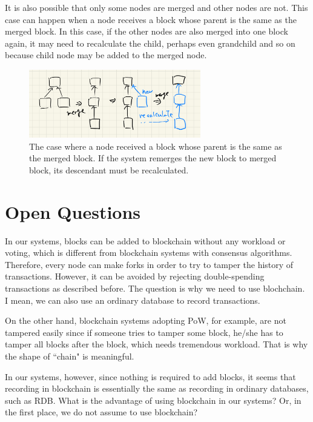 \documentclass[a4j,11pt,uplatex,twocolumn]{article}
\begin{document}
It is also possible that only some nodes are merged and other nodes are not.
This case can happen when a node receives a block whose parent is the same as the merged block.
In this case, if the other nodes are also merged into one block again, it may need to recalculate the child, perhaps even grandchild and so on because child node may be added to the merged node.
\begin{figure}[tbp]
    \begin{center}
        \includegraphics[width=7.5cm]{./fig/recalculate.jpeg}
        \caption{The case where a node received a block whose parent is the same as the merged block. If the system remerges the new block to merged block, its descendant must be recalculated.}
        \label{fig:recalculate}
    \end{center}
\end{figure}

\section{Open Questions}
In our systems, blocks can be added to blockchain without any workload or voting, which is different from blockchain systems with consensus algorithms.
Therefore, every node can make forks in order to try to tamper the history of transactions.
However, it can be avoided by rejecting double-spending transactions as described before.
The question is why we need to use blochchain.
I mean, we can also use an ordinary database to record transactions.

On the other hand, blockchain systems adopting PoW, for example, are not tampered easily since if someone tries to tamper some block, he/she has to tamper all blocks after the block, which needs tremendous workload.
That is why the shape of ``chain" is meaningful.

In our systems, however, since nothing is required to add blocks, it seems that recording in blockchain is essentially the same as recording in ordinary databases, such as RDB.
What is the advantage of using blockchain in our systems?
Or, in the first place, we do not assume to use blockchain?
\end{document}
